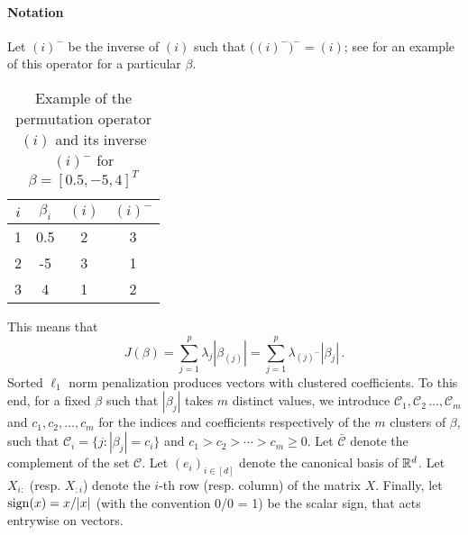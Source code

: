 \paragraph{Notation}\label{sec:notation}

Let \((i)^{-}\) be the inverse of \((i)\) such that
\(\big((i)^-\big)^- = (i)\); see  for an
example of this operator for a particular \(\beta\).
\begin{table}[hbt]
  \centering
  \caption{Example of the permutation operator \((i)\) and its inverse
    \((i)^-\) for $\beta = [0.5, -5, 4]^T$}
    \label{tab:permutation-example}
  \begin{tabular}{cccc}
    \toprule
    \(i\) & \(\beta_i\) & \((i)\) & \((i)^-\) \\
    \midrule
    1     & 0.5         & 2       & 3         \\
    2     & -5          & 3       & 1         \\
    3     & 4           & 1       & 2         \\
    \bottomrule
  \end{tabular}
\end{table}
This means that
\[
  J(\beta) = \sum_{j=1}^p \lambda_j |\beta_{(j)}|
  = \sum_{j=1}^p \lambda_{(j)^-}|\beta_j| \,.
\]
Sorted $\ell_1$ norm penalization produces vectors with clustered coefficients.
To this end, for a fixed $\beta$ such that $|\beta_j|$ takes $m$ distinct values, we introduce \(\mathcal{C}_1, \mathcal{C}_2\, \dots, \mathcal{C}_m\) and \(c_1,
c_2, \dots, c_m\) for the indices and coefficients respectively of the \(m\)
clusters of $\beta$, such that
$\mathcal{C}_i = \{j : |\beta_j| = c_i\}$ and $c_1 > c_2 > \cdots > c_m \geq 0.$
Let \(\bar{\mathcal{C}}\) denote the complement of the set \(\mathcal{C}\).
Let $(e_i)_{i \in [d]}$ denote the canonical basis of $\mathbb{R}^d$.
Let $X_{i:}$ (resp. $X_{:i}$) denote the $i$-th row (resp. column) of the matrix $X$.
Finally, let $\operatorname{sign}(x) = x / |x|$ (with the convention 0/0 = 1) be the scalar sign, that acts entrywise on vectors.


